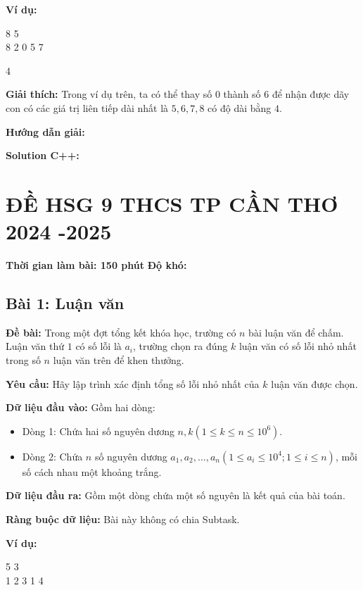 \documentclass[12pt]{scrartcl}  %
\begin{document}
\textbf{Ví dụ:}
\begin{tcolorbox}[colback=gray!5!white, colframe=blue!50!black, title=Input]
8 5\\ 
8 2 0 5 7
\end{tcolorbox}
\begin{tcolorbox}[colback=gray!5!white, colframe=green!50!black, title=Output]
4
\end{tcolorbox}

\textbf{Giải thích:}
Trong ví dụ trên, ta có thể thay số $0$ thành số $6$ để nhận được dãy con có các giá trị liên tiếp dài nhất là $5, 6, 7, 8$ có độ dài bằng $4$.

\textbf{Hướng dẫn giải:}

\textbf{Solution C++:}

\section{ĐỀ HSG 9 THCS TP CẦN THƠ 2024 -2025}

\textbf{Thời gian làm bài: 150 phút}
\textbf{Độ khó: }

\subsection{Bài 1: Luận văn}

\textbf{Đề bài:}
Trong một đợt tổng kết khóa học, trường có $n$ bài luận văn để chấm. Luận văn thứ $1$ có số lỗi là $a_i$, trường chọn ra đúng $k$ luận văn có số lỗi nhỏ nhất trong số $n$ luận văn trên để khen thưởng. 

\textbf{Yêu cầu:}
Hãy lập trình xác định tổng số lỗi nhỏ nhất của $k$ luận văn được chọn. 

\textbf{Dữ liệu đầu vào:}
Gồm hai dòng:
\begin{itemize}
    \item Dòng 1: Chứa hai số nguyên dương $n, k (1 \leq k \leq n \leq 10^6)$.
    \item Dòng 2: Chứa $n$ số nguyên dương $a_1, a_2, ... , a_n (1 \leq a_i \leq 10^4; 1 \leq i \leq n)$, mỗi số cách nhau một khoảng trắng.
\end{itemize}

\textbf{Dữ liệu đầu ra:}
Gồm một dòng chứa một số nguyên là kết quả của bài toán.

\textbf{Ràng buộc dữ liệu:}
Bài này không có chia Subtask. 

\textbf{Ví dụ:}
\begin{tcolorbox}[colback=gray!5!white, colframe=blue!50!black, title=Input]
5 3\\
1 2 3 1 4
\end{tcolorbox}
\end{document}
